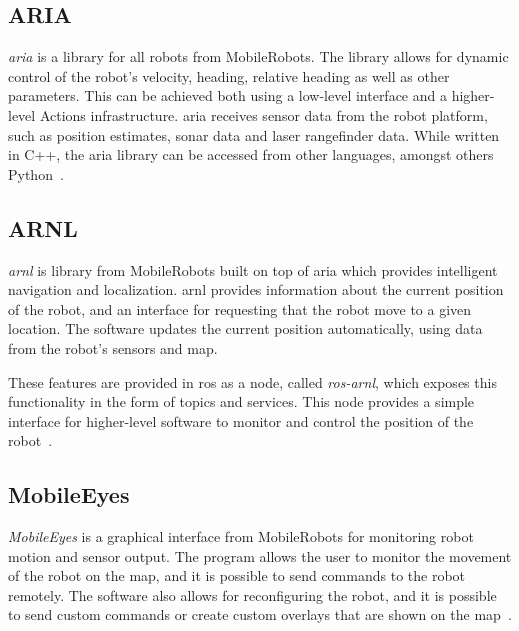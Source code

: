 \documentclass[\rootfolder/main.tex]{subfiles}
\begin{document}
\subsection{ARIA}

\emph{\acrfull{aria}} is a \CC library for all robots from MobileRobots.
The library allows for dynamic control of the robot's velocity, heading, relative heading as well as other parameters.
This can be achieved both using a low-level interface and a higher-level Actions infrastructure.
\acrshort{aria} receives sensor data from the robot platform, such as position estimates, sonar data and laser rangefinder data.
While written in C++, the \acrshort{aria} library can be accessed from other languages, amongst others Python~\cite{ARIA}.

\subsection{ARNL}

\emph{\acrfull{arnl}} is \CC library from MobileRobots built on top of \acrshort{aria} which provides intelligent navigation and localization.
\acrshort{arnl} provides information about the current position of the robot, and an interface for requesting that the robot move to a given location.
The software updates the current position automatically, using data from the robot's sensors and map.

These features are provided in \acrshort{ros} as a node, called \emph{ros-arnl}, which exposes this functionality in the form of topics and services.
This node provides a simple interface for higher-level software to monitor and control the position of the robot~\cite{ARNL}.


\subsection{MobileEyes}

\emph{MobileEyes} is a graphical interface from MobileRobots for monitoring robot motion and sensor output.
The program allows the user to monitor the movement of the robot on the map, and it is possible to send commands to the robot remotely.
The software also allows for reconfiguring the robot, and it is possible to send custom commands or create custom overlays that are shown on the map~\cite{MobileEyes}.
\end{document}
